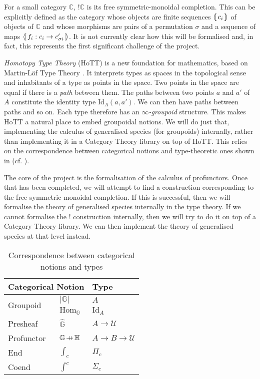 \documentclass[12pt, parskip]{scrartcl}
\DeclareMathOperator\prof{\ooalign{\hss$\Mapsfromchar$\hss\cr$\to$}}
\DeclareMathOperator\ltri{\langle\mkern-3mu[}
\DeclareMathOperator\rtri{]\mkern-3mu\rangle}
\begin{document}
For a small category $\mathbb{C}$, $!\mathbb{C}$ is its free symmetric-monoidal completion. This can be explicitly defined as the category whose objects are finite sequences $\ltri c_i \rtri$ of objects of $\mathbb{C}$ and whose morphisms are pairs of a permutation $\sigma$ and a sequence of maps $\ltri f_i : c_i \to c'_{\sigma i} \rtri$. It is not currently clear how this will be formalised and, in fact, this represents the first significant challenge of the project.

\emph{Homotopy Type Theory} (HoTT) \cite{hottbook} is a new foundation for mathematics, based on Martin-L\"of Type Theory \cite{martin1975intuitionistic}. It interprets types as spaces in the topological sense and inhabitants of a type as points in the space. Two points in the space are equal if there is a \emph{path} between them. The paths between two points $a$ and $a'$ of $A$ constitute the identity type $\mathrm{Id}_A(a, a')$. We can then have paths between paths and so on. Each type therefore has an \emph{$\infty$-groupoid} structure. This makes HoTT a natural place to embed groupoidal notions. We will do just that, implementing the calculus of generalised species (for groupoids) internally, rather than implementing it in a Category Theory library on top of HoTT. This relies on the correspondence between categorical notions and type-theoretic ones shown in  (cf. \cite{lawvere1973metric}).

The core of the project is the formalisation of the calculus of profunctors. Once that has been completed, we will attempt to find a construction corresponding to the free symmetric-monoidal completion. If this is successful, then we will formalise the theory of generalised species internally in the type theory. If we cannot formalise the $!$ construction internally, then we will try to do it on top of a Category Theory library. We can then implement the theory of generalised species at that level instead.

\begin{table}[t]
  \centering
  \def\arraystretch{1.5}
  \begin{tabular}{ll|l}
    \multicolumn{2}{l|}{Categorical Notion} & Type \\
    \hline
    \multirow{2}{*}{Groupoid} & $|\mathbb{G}|$ & $A$ \\
    & $\mathrm{Hom}_\mathbb{G}$ & $\mathrm{Id}_A$ \\
    Presheaf & $\widehat{\mathbb{G}}$ & $A \to \mathcal{U}$ \\
    Profunctor & $\mathbb{G} \prof \mathbb{H}$ & $A \to B \to \mathcal{U}$ \\
    End & $\int_c$ & $\Pi_c$ \\
    Coend & $\int^c$ & $\Sigma_c$ \\
  \end{tabular}
  \caption{Correspondence between categorical notions and types}
  \label{typescorrespondence}
\end{table}
\end{document}
